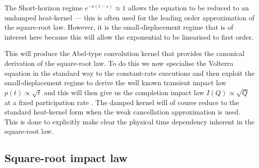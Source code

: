 \documentclass[5p,final]{elsarticle}
\begin{document}
The Short-horizon regime $e^{-\nu(t-s)} \approx 1$ allows the equation to be reduced to an undamped heat-kernel --- this is often used for the leading order approximation of the square-root law. However, it is the small-displacement regime that is of interest here because this will allow the exponential to be linearised to first order. 

This will produce the Abel-type convolution kernel that provides the canonical derivation of the square-root law. To do this we now specialise the Volterra equation in the standard way to the constant-rate executions and then exploit the small-displacement regime to derive the well known transient impact law $p(t) \propto \sqrt{t}$ and this will then give us the completion impact law $I(Q) \propto \sqrt{Q}$ at a fixed participation rate \cite{bouchaud2009markets,toth2011anomalous,donier2015fully}. The damped kernel will of course reduce to the standard heat-kernel form when the weak cancellation approximation is used. This is done to explicitly make clear the physical time dependency inherent in the square-root law.  

\subsection{Square-root impact law} \label{sec:sqrt}

\end{document}
